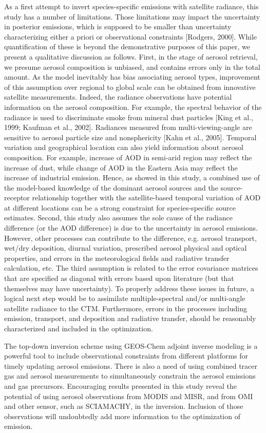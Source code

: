  As a first attempt to invert species-specific emissions with satellite radiance, this study has a number of limitations.
 Those limitations may impact the uncertainty in posterior emissions, which is supposed to be smaller than uncertainty characterizing either a priori or observational constraints [Rodgers, 2000].
  While quantification of these is beyond the demonstrative purposes of this paper, we present a qualitative discussion as follows.
 First, in the stage of aerosol retrieval, we presume aerosol composition is unbiased, and contains errors only in the total amount.
 As the model inevitably has bias associating aerosol types, improvement of this assumption over regional to global scale can be obtained from innovative satellite measurements.
 Indeed, the radiance observations have potential information on the aerosol composition.
 For example, the spectral behavior of the radiance is used to discriminate smoke from mineral dust particles [King et al., 1999; Kaufman et al., 2002].
 Radiances measured from multi-viewing-angle are sensitive to aerosol particle size and nonsphericity [Kahn et al., 2005].
 Temporal variation and geographical location can also yield information about aerosol composition.
 For example, increase of AOD in semi-arid region may reflect the increase of dust, while change of AOD in the Eastern Asia may reflect the increase of industrial emission.
 Hence, as showed in this study, a combined use of the model-based knowledge of the dominant aerosol sources and the source-receptor relationship together with the satellite-based temporal variation of AOD at different locations can be a strong constraint for species-specific source estimates.
 Second, this study also assumes the sole cause of the radiance difference (or the AOD difference) is due to the uncertainty in aerosol emissions.
 However, other processes can contribute to the difference, e.g. aerosol transport, wet/dry deposition, diurnal variation, prescribed aerosol physical and optical properties, and errors in the meteorological fields and radiative transfer calculation, etc.
 The third assumption is related to the error covariance matrices that are specified as diagonal with errors based upon literature (but that themselves may have uncertainty).
 To properly address these issues in future, a logical next step would be to assimilate multiple-spectral and/or multi-angle satellite radiance to the CTM.
 Furthermore, errors in the processes including emission, transport, and deposition and radiative transfer, should be reasonably characterized and included in the optimization. 

The top-down inversion scheme using GEOS-Chem adjoint inverse modeling is a powerful tool to include observational constraints from different platforms for timely updating aerosol emissions.
 There is also a need of using combined tracer gas and aerosol measurements to simultaneously constrain the aerosol emissions and gas precursors.
 Encouraging results presented in this study reveal the potential of using aerosol observations from MODIS and MISR,  and  from OMI and other sensor, such as SCIAMACHY, in the inversion. Inclusion of those observations will undoubtedly add more information to the optimization of emission. 

